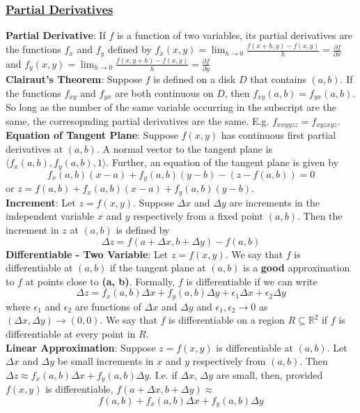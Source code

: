 \documentclass{article}
\begin{document}
\begin{multicols*}{3}
\subsubsection*{\underline{Partial Derivatives}}
\textbf{Partial Derivative}: If $f$ is a function of two variables, its partial derivatives are the functions $f_x$ and $f_y$ defined by $f_x(x,y)=\lim_{h\to0}\frac{f(x+h,y)-f(x,y)}{h}=\frac{\partial f}{\partial x}$ and $f_y(x,y)=\lim_{h\to0}\frac{f(x,y+h)-f(x,y)}{h}=\frac{\partial f}{\partial y}$\\
\textbf{Clairaut's Theorem}: Suppose $f$ is defined on a disk $D$ that contains $(a, b)$. If the functions $f_{xy}$ and $f_{yx}$ are both continuous on $D$, then
$f_{xy}(a, b) = f_{yx}(a, b)$. So long as the number of the same variable occurring in the subscript are the same, the corresopnding partial derivatives are the same. E.g. $f_{xxyyzz}=f_{xyzxyz}$. \\
\textbf{Equation of Tangent Plane}: Suppose $f(x,y)$ has continuous first partial derivatives at $(a,b)$. A normal vector to the tangent plane is $\langle f_x(a,b), f_y(a,b), 1\rangle$. Further, an equation of the tangent plane is given by $$f_x(a,b)(x-a)+f_y(a,b)(y-b)-(z-f(a,b))=0$$ or $z=f(a,b)+f_x(a,b)(x-a)+f_y(a,b)(y-b)$.\\
\textbf{Increment}: Let $z = f(x,y)$. Suppose $\Delta x$ and $\Delta y$ are increments in the independent variable $x$ and $y$ respectively from a fixed point $(a, b)$. Then the increment in $z$ at $(a, b)$ is defined by $$\Delta z = f(a+\Delta x, b+\Delta y)-f(a,b)$$
\textbf{Differentiable - Two Variable}: Let $z = f(x,y)$. We say that $f$ is differentiable at $(a, b)$ if the tangent plane at $(a, b)$ is a \textbf{good} approximation to $f$ at points close to \textbf{(a, b)}. Formally, $f$ is differentiable if we can write $$\Delta z=f_x(a,b)\Delta x+f_y(a,b)\Delta y+\epsilon_1\Delta x+\epsilon_2\Delta y$$ where $\epsilon_1$ and $\epsilon_2$ are functions of $\Delta x$ and $\Delta y$ and $\epsilon_1, \epsilon_2\to 0$ as $(\Delta x, \Delta y)\to (0,0)$. We say that $f$ is differentiable on a region $R\subseteq \mathbb{R}^2$ if $f$ is differentiable at every point in $R$. \\
\textbf{Linear Approximation}: Suppose $z = f (x , y )$ is differentiable at $(a, b)$. Let $\Delta x$ and $\Delta y$ be small increments in $x$ and $y$ respectively from $(a, b)$. Then $\Delta z\approx f_x(a,b)\Delta x+f_y(a,b)\Delta y$. I.e. if $\Delta x$, $\Delta y$ are small, then, provided $f(x,y)$ is differentiable, $f(a+\Delta x,b+\Delta y)\approx$ $$ f(a,b)+f_x(a,b)\Delta x+f_y(a,b)\Delta y$$ 

\end{multicols*}
\end{document}
